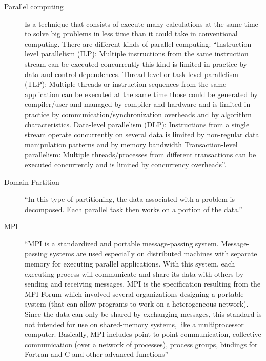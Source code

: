 \documentclass[fleqn,10pt]{SelfArx} %
\begin{document}
\begin{description}
	\item[Parallel computing] 
	Is a technique that consists of execute many calculations at the same time to solve big problems in less time than it could take in conventional computing. There are different kinds of parallel computing:
	“Instruction-level parallelism (ILP): Multiple instructions from the same instruction stream can be executed concurrently this kind is limited in practice by data and control dependences.
	Thread-level or task-level parallelism (TLP): Multiple threads or instruction sequences from the same application can be executed at the same time those could be generated by compiler/user and managed by compiler and hardware and is limited in practice by communication/synchronization overheads and by algorithm characteristics.
	Data-level parallelism (DLP): Instructions from a single stream operate concurrently on several data is limited by non-regular data manipulation patterns and by memory bandwidth 
	Transaction-level parallelism: Multiple threads/processes from different transactions can be executed concurrently and is limited by concurrency overheads”\cite{Parallel Computing}.
	\item[Domain Partition] “In this type of partitioning, the data associated with a problem is decomposed. Each parallel task then works on a portion of the data.” \cite{parallel_comp_lawrence_nat_lab}
	
	\item[MPI] 
	“MPI is a standardized and portable message-passing system. Message-passing systems are used especially on distributed machines with separate memory for executing parallel applications. With this system, each executing process will communicate and share its data with others by sending and receiving messages. MPI is the specification resulting from the MPI-Forum which involved several organizations designing a portable system (that can allow programs to work on a heterogeneous network).
	Since the data can only be shared by exchanging messages, this standard is not intended for use on shared-memory systems, like a multiprocessor computer. Basically, MPI includes point-to-point communication, collective communication (over a network of processes), process groups, bindings for Fortran and C and other advanced functions” \cite{MPI}
	

\end{description}
\end{document}
